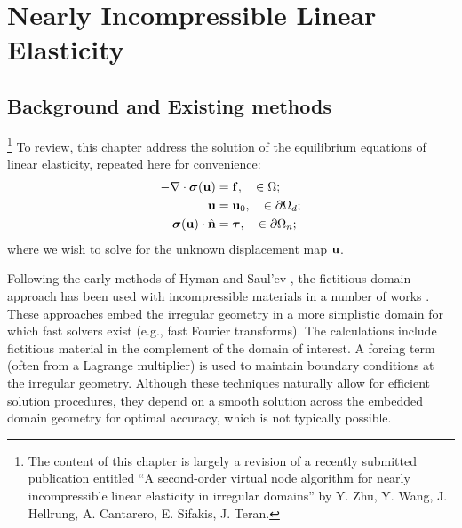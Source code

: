 %

\chapter{Nearly Incompressible Linear Elasticity} \label{ch:pt2.LE}

\section{Background and Existing methods} \label{sec:ch5.background}

\footnote{The content of this chapter is largely a revision of a recently submitted publication entitled ``A second-order virtual node
algorithm for nearly incompressible linear elasticity in irregular domains'' by Y. Zhu, Y. Wang, J. Hellrung, A. Cantarero, E. Sifakis, J. Teran.}
To review, this chapter address the solution of the equilibrium equations of linear elasticity, repeated here for convenience:
\begin{subequations} \label{eq:ch5.elasticity}
\begin{align}
-\nabla \cdot \boldsymbol{\sigma}(\mathbf{u}) & = \mathbf{f}, \quad \in \Omega; \\
\mathbf{u} & = \mathbf{u}_0, \quad \in \partial\Omega_d; \\
\boldsymbol{\sigma}(\mathbf{u}) \cdot \hat{\mathbf{n}} & = \boldsymbol{\tau}, \quad \in \partial\Omega_n;
\end{align}
\end{subequations}
where we wish to solve for the unknown displacement map $\mathbf{u}$.

Following the early methods of Hyman \cite{Hyman52} and Saul'ev \cite{Saul'ev63}, the fictitious domain approach has been used with incompressible materials in a number of works \cite{Bertrand97, Glowinski99, Glowinski94b, Glowinski01, Biros04, Parussini08, Rutka08, Parussini09, Teran09}. These approaches embed the irregular geometry in a more simplistic domain for which fast solvers exist (e.g., fast Fourier transforms). The calculations include fictitious material in the complement of the domain of interest. A forcing term (often from a Lagrange multiplier) is used to maintain boundary conditions at the irregular geometry. Although these techniques naturally allow for efficient solution procedures, they depend on a smooth solution across the embedded domain geometry for optimal accuracy, which is not typically possible.

